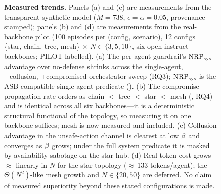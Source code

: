 \begin{figure}[t]
\caption{\textbf{Measured trends.} Panels (a) and (c) are measurements from the
transparent synthetic model ($M{=}738$, $\epsilon{=}\alpha{=}0.05$,
provenance-stamped); panels (b) and (d) are measurements from the real-backbone
pilot (100 episodes per (config, scenario), 12 configs
$=$ \{star, chain, tree, mesh\} $\times$ $N\in\{3,5,10\}$, six open instruct
backbones; PILOT-labelled). (a) The per-agent guardrail's $\mathrm{NRP}_{\mathrm{sys}}$ advantage over
no-defense shrinks across the single-agent, +collusion, +compromised-orchestrator
sweep (RQ3); $\mathrm{NRP}_{\mathrm{sys}}$ is the ASB-compatible single-agent predicate
(). (b) The compromise-propagation rate orders as chain $<$
tree $<$ star $<$ mesh (, RQ4) and is
identical across all six backbones---it is a deterministic structural functional of
the topology, so measuring it on one backbone suffices; mesh is now measured and
included. (c) Collusion advantage in the unsafe-action channel is clearest at low
$\beta$ and converges as $\beta$ grows; under the full system predicate it
is masked by availability sabotage on the star hub. (d) Real token cost grows
$\approx$ linearly in $N$ for the star topology ($\approx$\,133 tokens/agent); the
$\Theta(N^2)$-like mesh growth and $N\in\{20,50\}$ are deferred. No claim of
measured superiority beyond these stated configurations is made.}
\label{fig:results}
\end{figure}